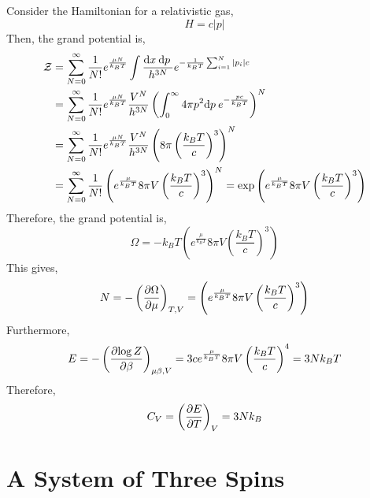 \documentclass[12pt]{article}
\begin{document}
Consider the Hamiltonian for a relativistic gas,
\[ H = c |p| \]
Then, the grand potential is,
\begin{align*}
\mathcal{Z} & = \sum_{N = 0}^\infty \frac{1}{N!} e^{ \frac{\mu N}{k_B T}} \int \frac{\mathrm{d}x \: \mathrm{d}p \:}{h^{3 N}} e^{ - \frac{1}{k_B T} \sum_{i = 1}^N |p_i| c}
\\
& = \sum_{N = 0}^\infty \frac{1}{N!}  e^{ \frac{\mu N}{k_B T}} \frac{V^N}{h^{3 N}} \left( \int_0^\infty 4 \pi p^2 \mathrm{d}p \: e^{-\frac{pc}{k_B T}} \right)^N
\\
& = \sum_{N = 0}^\infty \frac{1}{N!}  e^{ \frac{\mu N}{k_B T}} \frac{V^N}{h^{3 N}} \left( 8 \pi \left( \frac{k_B T}{c} \right)^3 \right)^N
\\
& = \sum_{N = 0}^\infty \frac{1}{N!} \left( e^{\frac{\mu}{k_B T}} 8 \pi V \left( \frac{k_B T}{c} \right)^3 \right)^N = \exp{\left( e^{\frac{\mu}{k_B T}} 8 \pi V \left( \frac{k_B T}{c} \right)^3 \right)} 
\end{align*}
Therefore, the grand potential is,
\[ \Omega = - k_B T \left( e^{\frac{\mu}{k_B T}} 8 \pi V \left( \frac{k_B T}{c} \right)^3 \right) \]
This gives,
\[ N = - \left( \frac{\partial{\Omega}}{\partial{\mu}} \right)_{T,V} = \left( e^{\frac{\mu}{k_B T}} 8 \pi V \left( \frac{k_B T}{c} \right)^3 \right) \]
Furthermore,
\[ E = - \left( \frac{\partial{\log{Z}}}{\partial{\beta}} \right)_{\mu \beta, V} = 3c  e^{\frac{\mu}{k_B T}} 8 \pi V \left( \frac{k_B T}{c} \right)^4 = 3 N k_B T  \]
Therefore,
\[ C_V = \left( \frac{\partial{E}}{\partial{T}} \right)_V = 3 N k_B \]

\section{A System of Three Spins}
\end{document}
